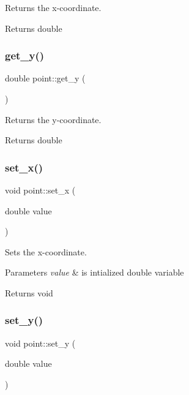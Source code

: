 Returns the x-\/coordinate. 

\begin{DoxyReturn}{Returns}
double 
\end{DoxyReturn}
\mbox{\label{classpoint_aad40587598ac1121bdbf2f45128edcae}} 
\subsubsection{\texorpdfstring{get\+\_\+y()}{get\_y()}}
{\footnotesize\ttfamily double point\+::get\+\_\+y (\begin{DoxyParamCaption}{ }\end{DoxyParamCaption})}



Returns the y-\/coordinate. 

\begin{DoxyReturn}{Returns}
double 
\end{DoxyReturn}
\mbox{\label{classpoint_a34325e94221145d6597fdfc2ffbc0ad0}} 
\subsubsection{\texorpdfstring{set\+\_\+x()}{set\_x()}}
{\footnotesize\ttfamily void point\+::set\+\_\+x (\begin{DoxyParamCaption}\item[{double}]{value }\end{DoxyParamCaption})}



Sets the x-\/coordinate. 


\begin{DoxyParams}{Parameters}
{\em value} & is intialized double variable \\
\hline
\end{DoxyParams}
\begin{DoxyReturn}{Returns}
void 
\end{DoxyReturn}
\mbox{\label{classpoint_ab17b468d5b16bd4feb4711ca5c7f0fe5}} 
\subsubsection{\texorpdfstring{set\+\_\+y()}{set\_y()}}
{\footnotesize\ttfamily void point\+::set\+\_\+y (\begin{DoxyParamCaption}\item[{double}]{value }\end{DoxyParamCaption})}



